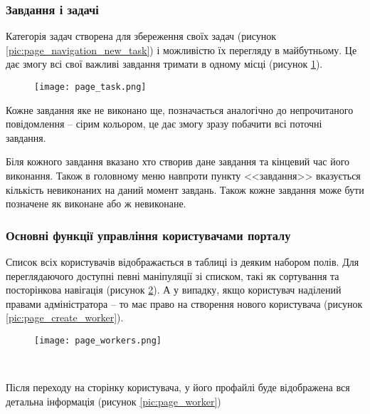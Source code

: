 \subsubsection{Завдання і задачі}
\par Категорія задач створена для збереження своїх задач (рисунок \ref{pic:page_navigation_new_task}) і можливістю їх перегляду в майбутньому. Це дає змогу всі свої важливі завдання тримати в одному місці (рисунок \ref{pic:page_task}).
  \begin{figure}[!ht]
  \centering
      \texttt{[image: page\_task.png]}
      \label{pic:page_task}
  \end{figure}
\par Кожне завдання яке не виконано ще, позначається аналогічно до непрочитаного повідомлення -- сірим кольором, це дає змогу зразу побачити всі поточні завдання. 
\par Біля кожного завдання вказано хто створив дане завдання та кінцевий час його виконання. Також в головному меню навпроти пункту <<завдання>> вказується кількість невиконаних на даний момент завдань. Також кожне завдання може бути позначене як виконане або ж невиконане.

\subsubsection{Основні функції управління користувачами порталу}
\par Список всіх користувачів відображається в таблиці із деяким набором полів. Для переглядаючого доступні певні маніпуляції зі списком, такі як сортування та посторінкова навігація (рисунок \ref{pic:page_workers}). А у випадку, якщо користувач наділений правами адміністратора -- то має право на створення нового користувача (рисунок \ref{pic:page_create_worker}).

  \begin{figure}[!ht]
  \centering
      \texttt{[image: page\_workers.png]}
      \par \
      \label{pic:page_workers}
  \end{figure}


\par Після переходу на сторінку користувача, у його профайлі буде відображена вся детальна інформація (рисунок \ref{pic:page_worker})
  
